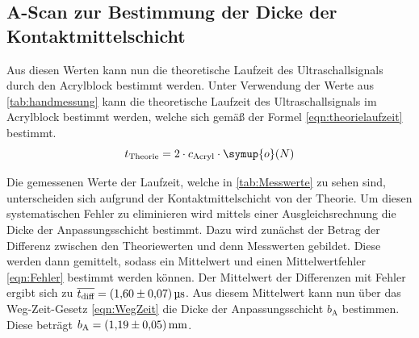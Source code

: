 \subsection{A-Scan zur Bestimmung der Dicke der Kontaktmittelschicht}
\label{subsec:ascankontakt}
Aus diesen Werten kann nun die theoretische Laufzeit des Ultraschallsignals durch den Acrylblock bestimmt werden. 
Unter Verwendung der Werte aus \autoref{tab:handmessung} kann die theoretische Laufzeit des Ultraschallsignals im Acrylblock bestimmt werden,
welche sich gemäß der Formel \eqref{eqn:theorielaufzeit} bestimmt.
\begin{equation}
  \label{eqn:theorielaufzeit}
  t_{\text{Theorie}} = 2 \cdot c_{\text{Acryl}} \cdot \symup{o}(N)
\end{equation}

Die gemessenen Werte der Laufzeit, welche in \autoref{tab:Messwerte} zu sehen sind, 
unterscheiden sich aufgrund der Kontaktmittelschicht von der Theorie. Um diesen systematischen Fehler zu eliminieren wird mittels einer Ausgleichsrechnung die Dicke
der Anpassungsschicht bestimmt. Dazu wird zunächst der Betrag der Differenz zwischen den Theoriewerten und denn Messwerten gebildet. Diese werden dann gemittelt, sodass ein Mittelwert
und einen Mittelwertfehler \eqref{eqn:Fehler} bestimmt werden können. Der Mittelwert der Differenzen mit Fehler ergibt sich zu $\overline{t_{\text{diff}}} = \qty{1.60+-0.07}{\micro\second}$.
Aus diesem Mittelwert kann nun über das Weg-Zeit-Gesetz \eqref{eqn:WegZeit} die Dicke der Anpassungsschicht $b_{\text{A}}$ bestimmen.
Diese beträgt $b_{\text{A}} = \qty{1.19+-0.05}{\milli\metre}$.
